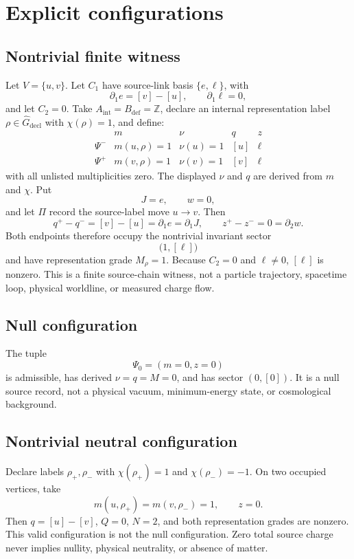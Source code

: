 \documentclass[11pt]{article}
\newcommand{\Aint}{A_{\mathrm{int}}}
\newcommand{\Bdef}{B_{\mathrm{def}}}
\newcommand{\Rdecl}{\widehat G_{\mathrm{decl}}}
\begin{document}
\section{Explicit configurations}

\subsection{Nontrivial finite witness}

Let \(V=\{u,v\}\). Let \(C_1\) have source-link basis
\(\{e,\ell\}\), with
\[
  \partial_1 e=[v]-[u],
  \qquad
  \partial_1\ell=0,
\]
and let \(C_2=0\). Take
\(\Aint=\Bdef=\mathbb Z\), declare an internal representation label
\(\rho\in\Rdecl\) with \(\chi(\rho)=1\), and define:
\[
\begin{array}{c|cccc}
 & m & \nu & q & z\\
\hline
\Psi^- & m(u,\rho)=1 & \nu(u)=1 & [u] & \ell\\
\Psi^+ & m(v,\rho)=1 & \nu(v)=1 & [v] & \ell
\end{array}
\]
with all unlisted multiplicities zero. The displayed \(\nu\) and \(q\) are
derived from \(m\) and \(\chi\). Put
\[
  J=e,\qquad w=0,
\]
and let \(\Pi\) record the source-label move \(u\to v\). Then
\[
  q^+-q^-=[v]-[u]=\partial_1e=\partial_1J,
  \qquad
  z^+-z^-=0=\partial_2w.
\]
Both endpoints therefore occupy the nontrivial invariant sector
\[
  \bigl(1,[\ell]\bigr)
\]
and have representation grade \(M_\rho=1\).
Because \(C_2=0\) and \(\ell\neq0\), \([\ell]\) is nonzero. This is a
finite source-chain witness, not a particle trajectory, spacetime loop,
physical worldline, or measured charge flow.

\subsection{Null configuration}

The tuple
\[
  \Psi_0=(m=0,z=0)
\]
is admissible, has derived \(\nu=q=M=0\), and has sector \((0,[0])\).
It is a null source record, not a physical vacuum, minimum-energy state, or
cosmological background.

\subsection{Nontrivial neutral configuration}

Declare labels \(\rho_+,\rho_-\) with
\(\chi(\rho_+)=1\) and \(\chi(\rho_-)=-1\). On two occupied vertices, take
\[
  m(u,\rho_+)=m(v,\rho_-)=1,\qquad z=0.
\]
Then \(q=[u]-[v]\), \(Q=0\), \(N=2\), and both representation grades are
nonzero. This valid configuration is
not the null configuration. Zero total source charge never implies nullity,
physical neutrality, or absence of matter.
\end{document}
